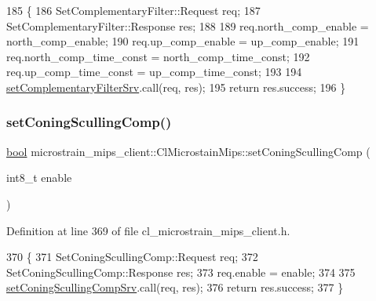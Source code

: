 \begin{DoxyCode}
185     \{
186         SetComplementaryFilter::Request req;
187         SetComplementaryFilter::Response res;
188 
189         req.north\_comp\_enable = north\_comp\_enable;
190         req.up\_comp\_enable = up\_comp\_enable;
191         req.north\_comp\_time\_const = north\_comp\_time\_const;
192         req.up\_comp\_time\_const = up\_comp\_time\_const;
193 
194         \hyperlink{classmicrostrain__mips__client_1_1ClMicrostainMips_a42e0fbe9912d59fe6dcd544945c34ad9}{setComplementaryFilterSrv}.call(req, res);
195         \textcolor{keywordflow}{return} res.success;
196     \}
\end{DoxyCode}
\mbox{\label{classmicrostrain__mips__client_1_1ClMicrostainMips_ae6962e87b75899d30b35eb8943bae8bc}} 
\subsubsection{\texorpdfstring{set\+Coning\+Sculling\+Comp()}{setConingScullingComp()}}
{\footnotesize\ttfamily \hyperlink{classbool}{bool} microstrain\+\_\+mips\+\_\+client\+::\+Cl\+Microstain\+Mips\+::set\+Coning\+Sculling\+Comp (\begin{DoxyParamCaption}\item[{int8\+\_\+t}]{enable }\end{DoxyParamCaption})\hspace{0.3cm}{\ttfamily [inline]}}



Definition at line 369 of file cl\+\_\+microstrain\+\_\+mips\+\_\+client.\+h.


\begin{DoxyCode}
370     \{
371         SetConingScullingComp::Request req;
372         SetConingScullingComp::Response res;
373         req.enable = enable;
374 
375         \hyperlink{classmicrostrain__mips__client_1_1ClMicrostainMips_a4673167297fb4266bc2f2bcfa8d5af13}{setConingScullingCompSrv}.call(req, res);
376         \textcolor{keywordflow}{return} res.success;
377     \}
\end{DoxyCode}
\mbox{\label{classmicrostrain__mips__client_1_1ClMicrostainMips_ace3d69bf8ea5e71b6928fae2c8736bd2}} 
